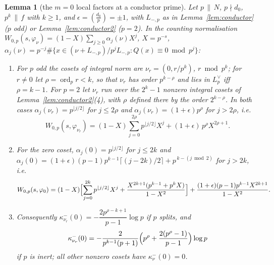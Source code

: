 \documentclass[11pt,reqno]{amsart}
\theoremstyle{plain}
\newtheorem{lemma}[theorem]{Lemma}
\theoremstyle{definition}
\DeclareMathOperator{\ord}{ord}
\begin{document}
\begin{lemma}[the $m=0$ local factors at a conductor prime]\label{lem:Wcond}
Let $p\,\|\,N$, $p\nmid d_0$, $p^k\,\|\,f$ with $k\ge1$, and $\epsilon=(\tfrac{d_0}{p})=\pm1$,
with $L_{-,p}$ as in Lemma~\ref{lem:conductor} ($p$ odd) or Lemma~\ref{lem:conductor2} ($p=2$). In
the counting normalisation $W_{0,p}(s,\varphi_\nu)=(1-X)\sum_{j\ge0}
\alpha_j(\nu)X^j$, $X=p^{-s}$, $\alpha_j(\nu)=p^{-j}\#\{x\in(\nu+L_{-,p})/p^jL_{-,p}:Q(x)\equiv0
\bmod p^j\}$:
\begin{enumerate}
\item For $p$ odd the cosets of integral norm are $\nu_r=(0,r/p^k)$, $r\bmod p^k$; for
      $r\neq0$ let $\rho=\ord_p r<k$, so that $\nu_r$ has order $p^{k-\rho}$ and lies in
      $L_p^\vee$ iff $\rho=k-1$. For $p=2$ let $\nu_r$ run over the $2^k-1$ nonzero integral cosets
      of Lemma~\ref{lem:conductor2}(4), with $\rho$ defined there by the order $2^{k-\rho}$. In
      both cases $\alpha_j(\nu_r)=p^{\lfloor j/2\rfloor}$ for $j\le2\rho$ and $\alpha_j(\nu_r)=
      (1+\epsilon)p^\rho$ for $j>2\rho$, i.e.
      \[
        W_{0,p}(s,\varphi_{\nu_r})=(1-X)\sum_{j=0}^{2\rho}p^{\lfloor j/2\rfloor}X^j
                                   +(1+\epsilon)\,p^\rho X^{2\rho+1}.
      \]
\item For the zero coset, $\alpha_j(0)=p^{\lfloor j/2\rfloor}$ for $j\le2k$ and
      $\alpha_j(0)=(1+\epsilon)(p-1)p^{k-1}\lceil(j-2k)/2\rceil+p^{\,k-(j\bmod2)}$ for $j>2k$, i.e.
      \[
        W_{0,p}(s,\varphi_0)=(1-X)\Bigl[\sum_{j=0}^{2k}p^{\lfloor j/2\rfloor}X^j
          +\frac{X^{2k+1}(p^{k-1}+p^kX)}{1-X^2}\Bigr]
          +\frac{(1+\epsilon)(p-1)p^{k-1}X^{2k+1}}{1-X^2}.
      \]
\item Consequently $\kappa^-_{\nu_r}(0)=-\dfrac{2p^{\rho-k+1}}{p-1}\log p$ if $p$ splits, and
      \[
        \kappa^-_{\nu_r}(0)=-\frac{2}{p^{k-1}(p+1)}\Bigl(p^\rho+\frac{2(p^\rho-1)}{p-1}\Bigr)\log p
      \]
      if $p$ is inert; all other nonzero cosets have $\kappa^-_\nu(0)=0$.
\end{enumerate}
\end{lemma}
\end{document}
